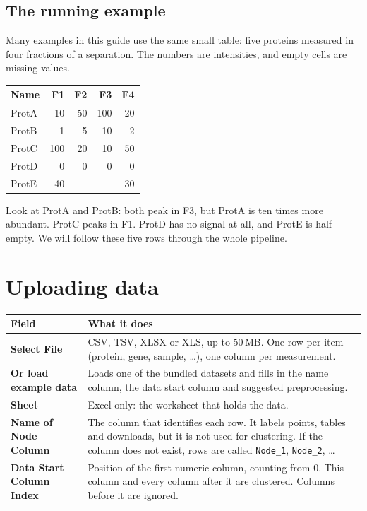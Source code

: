 \documentclass[11pt,a4paper]{article}
\newcommand{\ui}[1]{\textsf{\textbf{#1}}}   %
\begin{document}
\subsection*{The running example}

Many examples in this guide use the same small table: five proteins measured in four fractions of a separation.
The numbers are intensities, and empty cells are missing values.

\begin{center}
\begin{tabular}{lrrrr}
\toprule
Name & F1 & F2 & F3 & F4\\
\midrule
ProtA & 10 & 50 & 100 & 20\\
ProtB & 1 & 5 & 10 & 2\\
ProtC & 100 & 20 & 10 & 50\\
ProtD & 0 & 0 & 0 & 0\\
ProtE & 40 & & & 30\\
\bottomrule
\end{tabular}
\end{center}

Look at ProtA and ProtB: both peak in F3, but ProtA is ten times more abundant. ProtC peaks in F1. ProtD has no
signal at all, and ProtE is half empty. We will follow these five rows through the whole pipeline.

\section{Uploading data}

\begin{center}
\begin{tabularx}{\textwidth}{lL}
\toprule
Field & What it does\\
\midrule
\ui{Select File} & CSV, TSV, XLSX or XLS, up to 50\,MB. One row per item (protein, gene, sample, \dots), one
  column per measurement.\\
\ui{Or load example data} & Loads one of the bundled datasets and fills in the name column, the data start column
  and suggested preprocessing.\\
\ui{Sheet} & Excel only: the worksheet that holds the data.\\
\ui{Name of Node Column} & The column that identifies each row. It labels points, tables and downloads, but it is
  not used for clustering. If the column does not exist, rows are called \texttt{Node\_1}, \texttt{Node\_2},
  \dots\\
\ui{Data Start Column Index} & Position of the first numeric column, counting from 0. This column and every column
  after it are clustered. Columns before it are ignored.\\
\bottomrule
\end{tabularx}
\end{center}
\end{document}
